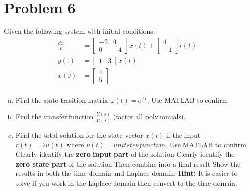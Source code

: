 \documentclass{article}
\begin{document}
\section*{Problem 6}
Given the following system with initial conditions:
\begin{align*}
\frac{dx}{dt} &= \begin{bmatrix} -2 & 0 \\ 0 & -4 \end{bmatrix} x(t) + \begin{bmatrix} 4 \\ -1 \end{bmatrix} r(t) \\
y(t) &= \begin{bmatrix} 1 & 3 \end{bmatrix} x(t) \\
x(0) &= \begin{bmatrix} 4 \\ 5 \end{bmatrix} \\
\end{align*}
\begin{enumerate}[a)]
\item Find the state trasition matrix $\varphi (t) = e^{At}$.
{\color{blue} Use MATLAB to confirm}
\newline

\item Find the transfer function $\frac{Y(s)}{R(s)}$ (factor all polynomials).
\newline
\item Find the total solution for the state vector $x(t)$ if the input $r(t) = 2 u(t)$ where $u(t) = unit step function$.
{\color{blue} Use MATLAB to confirm}
\newline
\hspace*{10mm} Clearly identify the \textbf{zero input part} of the solution
\newline
\hspace*{10mm} Clearly identify the \textbf{zero state part} of the solution
\newline
\hspace*{10mm} Then combine into a final result
\newline
Show the results in both the time domain and Laplace domain.
\textbf{Hint:} It is easier to solve if you work in the Laplace domain then convert to the time domain.
\end{enumerate}
\end{document}
